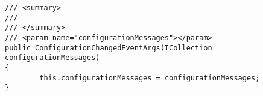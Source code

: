 \begin{lstlisting}[language={[Sharp]C}, caption=Beispiele für überflüssige Kommentare, label=lst:RedundantComment]
/// <summary>
/// 
/// </summary>
/// <param name="configurationMessages"></param>
public ConfigurationChangedEventArgs(ICollection configurationMessages)
{
		this.configurationMessages = configurationMessages;
}
\end{lstlisting}


